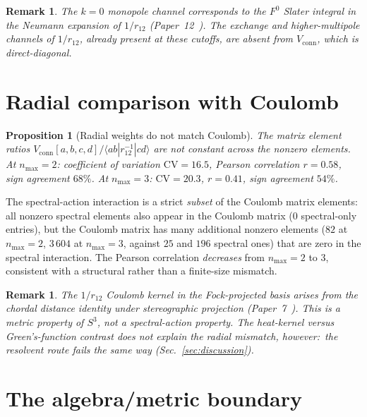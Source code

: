 \documentclass[twocolumn,pra,amsmath,amssymb,superscriptaddress]{revtex4-2}
\newtheorem{proposition}[theorem]{Proposition}
\newtheorem{remark}[theorem]{Remark}
\begin{document}
\begin{remark}
The $k = 0$ monopole channel corresponds to the $F^0$ Slater integral
in the Neumann expansion of $1/r_{12}$
(Paper~12~\cite{paper12}). The exchange and higher-multipole channels
of $1/r_{12}$, already present at these cutoffs, are absent from
$V_{\mathrm{conn}}$, which is direct-diagonal.
\end{remark}

\section{Radial comparison with Coulomb}
\label{sec:radial}

\begin{proposition}[Radial weights do not match Coulomb]
\label{prop:radial_negative}
The matrix element ratios $V_{\mathrm{conn}}[a,b,c,d] /
\langle ab | r_{12}^{-1} | cd \rangle$ are not constant across the
nonzero elements. At $n_{\max} = 2$: coefficient of variation $\mathrm{CV}
= 16.5$, Pearson correlation $r = 0.58$, sign agreement $68\%$. At
$n_{\max} = 3$: $\mathrm{CV} = 20.3$, $r = 0.41$, sign agreement
$54\%$.
\end{proposition}

The spectral-action interaction is a strict \emph{subset} of the
Coulomb matrix elements: all nonzero spectral elements also appear in
the Coulomb matrix ($0$ spectral-only entries), but the Coulomb matrix
has many additional nonzero elements ($82$ at $n_{\max} = 2$,
$3\,604$ at $n_{\max} = 3$, against $25$ and $196$ spectral ones) that
are zero in the spectral interaction. The Pearson correlation
\emph{decreases} from $n_{\max} = 2$ to $3$, consistent with a
structural rather than a finite-size mismatch.

\begin{remark}
The $1/r_{12}$ Coulomb kernel in the Fock-projected basis arises from
the chordal distance identity under stereographic projection
(Paper~7~\cite{paper7}). This is a \emph{metric} property of $S^3$,
not a spectral-action property. The heat-kernel versus
Green's-function contrast does not explain the radial mismatch, however:\
the resolvent route fails the same way (Sec.~\ref{sec:discussion}).
\end{remark}

\section{The algebra/metric boundary}
\label{sec:boundary}
\end{document}
